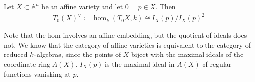 \begin{lemma}

Let \(X \subset{\mathbb{A}}^n\) be an affine variety and let
\(0 = p\in X\). Then
\begin{align*}
T_0(X)^\vee\coloneqq\hom_k(T_0X, k) \cong I_X(p) / I_X(p)^2
\end{align*}

\end{lemma}

\begin{remark}

Note that the hom involves an affine embedding, but the quotient of
ideals does not. We know that the category of affine varieties is
equivalent to the category of reduced \(k{\hbox{-}}\)algebras, since the
points of \(X\) biject with the maximal ideals of the coordinate ring
\(A(X)\). \(I_X(p)\) is the maximal ideal in \(A(X)\) of regular
functions vanishing at \(p\).

\end{remark}

